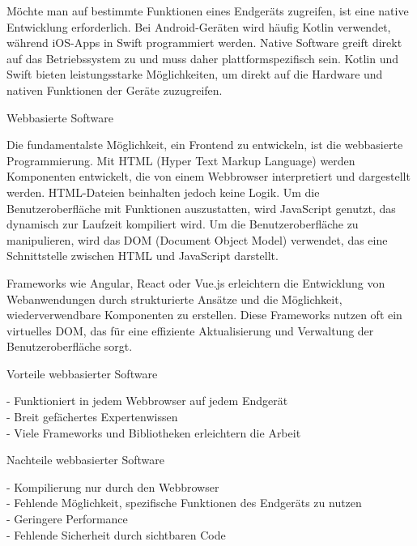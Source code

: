 Möchte man auf bestimmte Funktionen eines Endgeräts zugreifen, ist eine native Entwicklung erforderlich. Bei Android-Geräten wird häufig Kotlin verwendet, während iOS-Apps in Swift programmiert werden. Native Software greift direkt auf das Betriebssystem zu und muss daher plattformspezifisch sein. Kotlin und Swift bieten leistungsstarke Möglichkeiten, um direkt auf die Hardware und nativen Funktionen der Geräte zuzugreifen.

\vspace{0.5cm}

Webbasierte Software

Die fundamentalste Möglichkeit, ein Frontend zu entwickeln, ist die webbasierte Programmierung. Mit HTML (Hyper Text Markup Language) werden Komponenten entwickelt, die von einem Webbrowser interpretiert und dargestellt werden. HTML-Dateien beinhalten jedoch keine Logik. Um die Benutzeroberfläche mit Funktionen auszustatten, wird JavaScript genutzt, das dynamisch zur Laufzeit kompiliert wird. Um die Benutzeroberfläche zu manipulieren, wird das DOM (Document Object Model) verwendet, das eine Schnittstelle zwischen HTML und JavaScript darstellt.

\vspace{0.5cm}

Frameworks wie Angular, React oder Vue.js erleichtern die Entwicklung von Webanwendungen durch strukturierte Ansätze und die Möglichkeit, wiederverwendbare Komponenten zu erstellen. Diese Frameworks nutzen oft ein virtuelles DOM, das für eine effiziente Aktualisierung und Verwaltung der Benutzeroberfläche sorgt.

\vspace{0.5cm}

Vorteile webbasierter Software

- Funktioniert in jedem Webbrowser auf jedem Endgerät \\
- Breit gefächertes Expertenwissen \\
- Viele Frameworks und Bibliotheken erleichtern die Arbeit

\vspace{0.5cm}

Nachteile webbasierter Software

- Kompilierung nur durch den Webbrowser \\
- Fehlende Möglichkeit, spezifische Funktionen des Endgeräts zu nutzen \\
- Geringere Performance \\
- Fehlende Sicherheit durch sichtbaren Code

